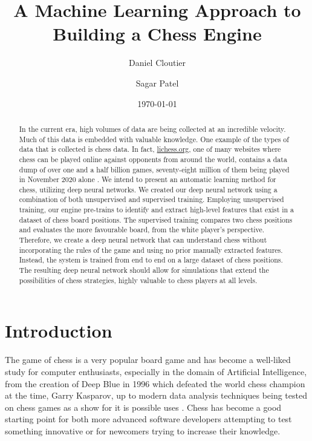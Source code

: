 \documentclass[12pt]{article}
\title{A Machine Learning Approach to Building a Chess Engine}
\author{Daniel Cloutier \and Sagar Patel}
\date{\today}
\begin{document}
    \begin{singlespace}
        \maketitle 
    \end{singlespace}

    \tableofcontents

    \clearpage

    \begin{abstract}
        In the current era, high volumes of data are being collected at an incredible velocity. Much of this data is embedded with valuable knowledge. \cite{main} One example of the types of data that is collected is chess data. In fact, \href{https://lichess.org/}{lichess.org}, one of many websites where chess can be played online against opponents from around the world, contains a data dump of over one and a half billion games, seventy-eight million of them being played in November 2020 alone \cite{lichessdb}. We intend to present an automatic learning method for chess, utilizing deep neural networks. We created our deep neural network using a combination of both unsupervised and supervised training. Employing unsupervised training, our engine pre-trains to identify and extract high-level features that exist in a dataset of chess board positions. The supervised training compares two chess positions and evaluates the more favourable board, from the white player's perspective. Therefore, we create a deep neural network that can understand chess without incorporating the rules of the game and using no prior manually extracted features. Instead, the system is trained from end to end on a large dataset of chess positions. The resulting deep neural network should allow for simulations that extend the possibilities of chess strategies, highly valuable to chess players at all levels.
    \end{abstract}
        
    \section{Introduction}
    The game of chess is a very popular board game and has become a well-liked study for computer enthusiasts, especially in the domain of Artificial Intelligence, from the creation of Deep Blue in 1996 which defeated the world chess champion at the time, Garry Kasparov, up to modern data analysis techniques being tested on chess games as a show for it is possible uses \cite{maiachess}\cite{piece_values}\cite{alphazero}. Chess has become a good starting point for both more advanced software developers attempting to test something innovative or for newcomers trying to increase their knowledge. 
\end{document}
